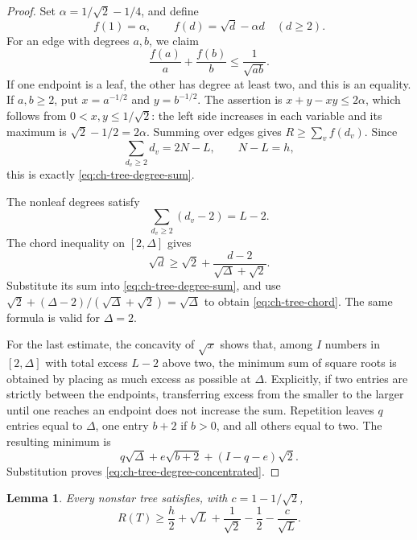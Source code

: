 \documentclass[11pt,a4paper]{article}
\newtheorem{lemma}[theorem]{Lemma}
\theoremstyle{remark}
\numberwithin{equation}{section}
\begin{document}
\begin{proof}
Set $\alpha=1/\sqrt2-1/4$, and define
\[
 f(1)=\alpha,\qquad f(d)=\sqrt d-\alpha d\quad(d\ge2).
\]
For an edge with degrees $a,b$, we claim
\[
                  \frac{f(a)}a+\frac{f(b)}b\le\frac1{\sqrt{ab}}.
\]
If one endpoint is a leaf, the other has degree at least two, and this
is an equality. If $a,b\ge2$, put $x=a^{-1/2}$ and $y=b^{-1/2}$.
The assertion is $x+y-xy\le2\alpha$, which follows from
$0<x,y\le1/\sqrt2$: the left side increases in each variable and its
maximum is $\sqrt2-1/2=2\alpha$.
Summing over edges gives $R\ge\sum_v f(d_v)$. Since
\[
 \sum_{d_v\ge2}d_v=2N-L,
 \qquad N-L=h,
\]
this is exactly \eqref{eq:ch-tree-degree-sum}.

The nonleaf degrees satisfy
\[
                   \sum_{d_v\ge2}(d_v-2)=L-2.
\]
The chord inequality on $[2,\Delta]$ gives
\[
 \sqrt d\ge\sqrt2+\frac{d-2}{\sqrt\Delta+\sqrt2}.
\]
Substitute its sum into \eqref{eq:ch-tree-degree-sum}, and use
$\sqrt2+(\Delta-2)/(\sqrt\Delta+\sqrt2)=\sqrt\Delta$ to obtain
\eqref{eq:ch-tree-chord}. The same formula is valid for $\Delta=2$.

For the last estimate, the concavity of $\sqrt x$ shows that, among
$I$ numbers in $[2,\Delta]$ with total excess $L-2$ above two, the
minimum sum of square roots is obtained by placing as much excess as
possible at $\Delta$. Explicitly, if two entries are strictly between
the endpoints, transferring excess from the smaller to the larger until
one reaches an endpoint does not increase the sum. Repetition leaves
$q$ entries equal to $\Delta$, one entry $b+2$ if $b>0$, and all others
equal to two. The resulting minimum is
\[
 q\sqrt\Delta+e\sqrt{b+2}+(I-q-e)\sqrt2.
\]
Substitution proves \eqref{eq:ch-tree-degree-concentrated}.
\end{proof}

\begin{lemma}\label{lem:ch-tree-leaf-bound}
Every nonstar tree satisfies, with $c=1-1/\sqrt2$,
\begin{equation}\label{eq:ch-tree-leaf-lower}
 R(T)\ge\frac h2+\sqrt L+\frac1{\sqrt2}-\frac12-\frac c{\sqrt L}.
\end{equation}
\end{lemma}
\end{document}
